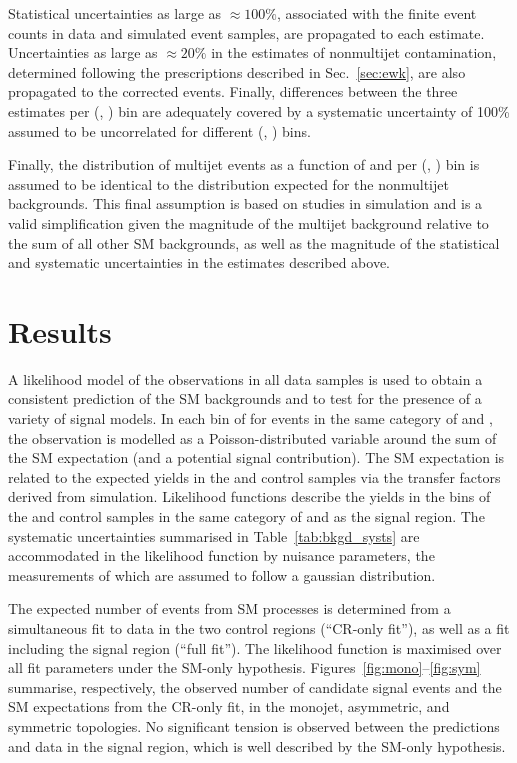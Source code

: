 Statistical uncertainties as large as ${\approx}100\%$, associated
with the finite event counts in data and simulated event samples, are
propagated to each estimate. Uncertainties as large as ${\approx}20\%$
in the estimates of nonmultijet contamination, determined following
the prescriptions described in Sec.~\ref{sec:ewk}, are also propagated
to the corrected events. Finally, differences between the three
estimates per (\njet, \scalht) bin are adequately covered by a
systematic uncertainty of 100\% assumed to be uncorrelated for
different (\njet, \scalht) bins.

Finally, the distribution of multijet events as a function of \nb and
\mht per (\njet, \scalht) bin is assumed to be identical to the
distribution expected for the nonmultijet backgrounds. This final
assumption is based on studies in simulation and is a valid
simplification given the magnitude of the multijet background relative
to the sum of all other SM backgrounds, as well as the magnitude of
the statistical and systematic uncertainties in the estimates
described above.


\section{Results}
\label{sec:result}

A likelihood model of the observations in all data samples is used to
obtain a consistent prediction of the SM backgrounds and to test for
the presence of a variety of signal models.  In each bin of \scalht
for events in the same category of \njet and \nb, the observation is
modelled as a Poisson-distributed variable around the sum of the SM
expectation (and a potential signal contribution). The SM expectation
is related to the expected yields in the \mj and \mmj control samples
via the transfer factors derived from simulation. Likelihood functions
describe the yields in the \scalht bins of the \mj and \mmj control
samples in the same category of \njet and \nb as the signal
region. The systematic uncertainties summarised in
Table~\ref{tab:bkgd_systs} are accommodated in the likelihood function
by nuisance parameters, the measurements of which are assumed to
follow a gaussian distribution.

The expected number of events from SM processes is determined from a
simultaneous fit to data in the two control regions (``CR-only fit''),
as well as a fit including the signal region (``full fit''). The
likelihood function is maximised over all fit parameters under the
SM-only hypothesis. Figures~\ref{fig:mono}--\ref{fig:sym} summarise,
respectively, the observed number of candidate signal events and the
SM expectations from the CR-only fit, in the monojet, asymmetric, and
symmetric topologies. No significant tension is observed between the
predictions and data in the signal region, which is well described by
the SM-only hypothesis.

